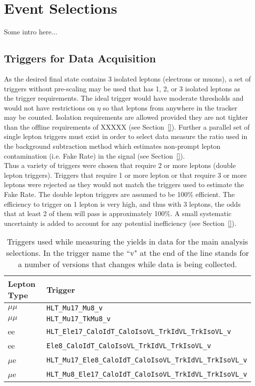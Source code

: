 \chapter{Event Selections}
\label{ch::EventSelections}
Some intro here...

\section{Triggers for Data Acquisition}
\label{sec:Triggers}
As the desired final state contains 3 isolated leptons (electrons or muons), a set of triggers without pre-scaling may be used that has 1, 2, or 3 isolated leptons as the trigger requirements. The ideal trigger would have moderate \pt thresholds and would not have restrictions on $\eta$ so that leptons from anywhere in the tracker may be counted. Isolation requirements are allowed provided they are not tighter than the offline requirements of XXXXX (see Section~\ref{}). Further a parallel set of single lepton triggers must exist in order to select data measure the ratio used in the background subtraction method which estimates non-prompt lepton contamination (i.e. Fake Rate) in the signal (see Section~\ref{}). \\
Thus a variety of triggers were chosen that require 2 or more leptons (double lepton triggers). Triggers that require 1 or more lepton or that require 3 or more leptons were rejected as they would not match the triggers used to estimate the Fake Rate. The double lepton triggers are assumed to be 100\% efficient. The efficiency to trigger on 1 lepton is very high, and thus with 3 leptons, the odds that at least 2 of them will pass is approximately 100\%. A small systematic uncertainty is added to account for any potential inefficiency (see Section~\ref{}).
	
\begin{table}[h]
\begin{center}
\caption{\small\label{tab:AnalysisTriggers} Triggers used while measuring the yields in data for the main analysis selections. In the trigger name the ``v" at the end of the line stands for a number of versions that changes while data is being collected.}
\begin{tabular}{l|l} \hline \hline
Lepton Type & Trigger  \\ \hline
$\mu\mu$     & \verb=HLT_Mu17_Mu8_v= \\
$\mu \mu$    &\verb=HLT_Mu17_TkMu8_v= \\
ee                   & \verb=HLT_Ele17_CaloIdT_CaloIsoVL_TrkIdVL_TrkIsoVL_v= \\
ee                   & \verb=Ele8_CaloIdT_CaloIsoVL_TrkIdVL_TrkIsoVL_v=\\
$\mu$e          & \verb=HLT_Mu17_Ele8_CaloIdT_CaloIsoVL_TrkIdVL_TrkIsoVL_v= \\
$\mu$e          & \verb=HLT_Mu8_Ele17_CaloIdT_CaloIsoVL_TrkIdVL_TrkIsoVL_v= \\
\hline
\end{tabular}
\end{center}
\end{table}

